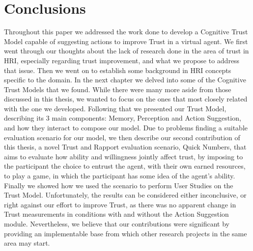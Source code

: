 \section{Conclusions}
Throughout this paper we addressed the work done to develop a Cognitive Trust Model capable of suggesting actions to improve Trust in a virtual agent. We first went through our thoughts about the lack of research done in the area of trust in \ac{HRI}, especially regarding trust improvement, and what we propose to address that issue. Then we went on to establish some background in \ac{HRI} concepts specific to the domain. In the next chapter we delved into some of the Cognitive Trust Models that we found. While there were many more aside from those discussed in this thesis, we wanted to focus on the ones that most closely related with the one we developed. Following that we presented our Trust Model, describing its 3 main components: Memory, Perception and Action Suggestion, and how they interact to compose our model. Due to problems finding a suitable evaluation scenario for our model, we then describe our second contribution of this thesis, a novel Trust and Rapport evaluation scenario, Quick Numbers, that aims to evaluate how ability and willingness jointly affect trust, by imposing to the participant the choice to entrust the agent, with their own earned resources, to play a game, in which the participant has some idea of the agent's ability. Finally we showed how we used the scenario to perform User Studies on the Trust Model. Unfortunately, the results can be considered either inconclusive, or right against our effort to improve Trust, as there was no apparent change in Trust measurements in conditions with and without the Action Suggestion module. Nevertheless, we believe that our contributions were significant by providing an implementable base from which other research projects in the same area may start. 
